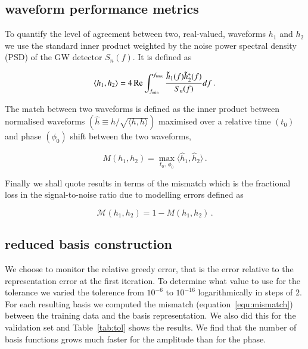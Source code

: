 \documentclass[aps,prd,reprint,superscriptaddress,preprintnumbers,showpacs,nofootinbib]{revtex4-1}
\begin{document}
\subsection{waveform performance metrics}

To quantify the level of agreement between two, real-valued, waveforms $h_1$ and
$h_2$ we use the standard inner product weighted by the noise power spectral
density (PSD) of the GW detector $S_n(f)$. It is defined
as~\cite{Cutler1994GravitationalWF}

\begin{equation}
\langle h_1, h_2 \rangle = 4 \, {\rm{Re}} \int_{f_{\rm{min}}}^{f_{\rm{max}}} \frac{\tilde{h}_{1}(f) \tilde{h}_{2}^{*}(f)}{S_n(f)} df \, .
\end{equation}

The match between two waveforms is defined as the inner product between
normalised waveforms $(\hat{h} \equiv h / \sqrt{\langle h,h \rangle})$
maximised over a relative time $(t_0)$ and phase $(\phi_0)$ shift between the two waveforms,

\begin{equation}
M(h_1, h_2) = \max_{t_0, \, \phi_0} \langle \hat{h}_1, \hat{h}_2 \rangle \, .
\end{equation}

Finally we shall quote results in terms of the mismatch which is
the fractional loss in the signal-to-noise ratio due to
modelling errors defined as

\begin{equation}
    \mathcal{M}(h_1, h_2) = 1 - M(h_1, h_2) \, .
\label{equ:mismatch}
\end{equation}

\subsection{reduced basis construction}

We choose to monitor the relative greedy error, that is the error relative to
the representation error at the first iteration. To determine what value to use
for the tolerance we varied the tolerence from $10^{-6}$ to $10^{-16}$
logarithmically in steps of $2$. For each resulting basis we computed the
mismatch (equation~\ref{equ:mismatch}) between the training data and the basis
representation. We also did this for the validation set and Table~\ref{tab:tol}
shows the results. We find that the number of basis functions grows much faster
for the amplitude than for the phase.
\end{document}
